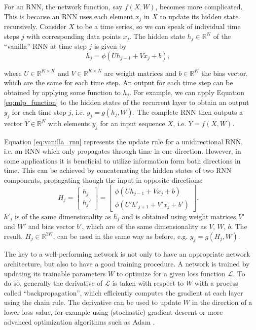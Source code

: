 For an RNN, the network function, say $f(X,W)$, becomes more complicated. This is because an RNN uses each element $x_j$ in $X$ to update its hidden state recursively. Consider $X$ to be a time series, so we can speak of individual time steps $j$ with corresponding data points $x_j$. The hidden state $h_{j} \in \mathbb{R}^K$ of the ``vanilla''-RNN at time step $j$ is given by
\begin{equation}
    \label{eq:vanilla_rnn}
    h_{j} = \phi(U h_{j-1} + V x_j + b),
\end{equation}

\noindent where $U \in \mathbb{R}^{K \times K}$ and $V \in \mathbb{R}^{K \times N}$ are weight matrices and $b \in \mathbb{R}^{K}$ the bias vector, which are the same for each time step. An output for each time step can be obtained by applying some function to $h_{j}$. For example, we can apply Equation \ref{eq:mlp_function} to the hidden states of the recurrent layer to obtain an output $y_j$ for each time step $j$, i.e. $y_j= g(h_{j}, W)$. The complete RNN then outputs a vector $Y \in \mathbb{R}^N$ with elements $y_j$ for an input sequence $X$, i.e. $Y = f(X, W)$.

Equation \ref{eq:vanilla_rnn} represents the update rule for a unidirectional RNN, i.e. an RNN which only propagates through time in one direction. However, in some applications it is beneficial to utilize information form both directions in time. This can be achieved by concatenating the hidden states of two RNN components, propagating though the input in opposite directions:
\begin{equation}
    H_j =  
    \begin{bmatrix}
        h_j \\
        h_j'
    \end{bmatrix} =
    \begin{bmatrix}
        \phi(U h_{j-1} + V x_j + b) \\
        \phi(U' h'_{j+1} + V' x_j + b')
    \end{bmatrix}.
\end{equation}
$h'_j$ is of the same dimensionality as $h_j$ and is obtained using weight matrices $V'$ and $W'$ and bias vector $b'$, which are of the same dimensionality as $V$, $W$, $b$. The result, $H_j \in \mathbb{R}^{2K}$, can be used in the same way as before, e.g. $y_j= g(H_{j}, W)$.

The key to a well-performing network is not only to have an appropriate network architecture, but also to have a good training procedure. A network is trained by updating its trainable parameters $W$ to optimize for a given loss function $\mathcal{L}$. To do so, generally the derivative of $\mathcal{L}$ is taken with respect to $W$ with a process called ``backpropagation'', which efficiently computes the gradient at each layer using the chain rule. The derivative can be used to update $W$ in the direction of a lower loss value, for example using (stochastic) gradient descent or more advanced optimization algorithms such as Adam \citep{kingma2014adam}.

